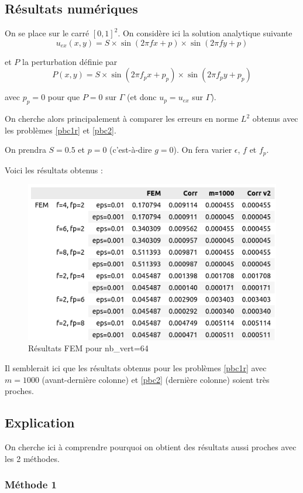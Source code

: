 \documentclass[french]{article}
\begin{document}
	\subsection{Résultats numériques}
	
	On se place sur le carré $[0,1]^2$. On considère ici la solution analytique suivante
	$$u_{ex}(x,y) = S\times\sin(2\pi fx + p)\times\sin(2\pi fy + p)$$ 
	
	et $P$ la perturbation définie par
	$$P(x,y)=S\times\sin(2\pi f_px + p_p)\times\sin(2\pi f_py + p_p)$$
	
	avec $p_p=0$ pour que $P=0$ sur $\Gamma$ (et donc $u_p=u_{ex}$ sur $\Gamma$). 
	
	On cherche alors principalement à comparer les erreurs en norme $L^2$ obtenus avec les problèmes \ref{pbc1r} et \ref{pbc2}.
	
	On prendra $S=0.5$ et $p=0$ (c'est-à-dire $g=0$). On fera varier $\epsilon$, $f$ et $f_p$. 
	
	Voici les résultats obtenus :
	
	\begin{minipage}{\linewidth}
		\begin{figure}[H]
			\centering
			\includegraphics[width=0.55\linewidth]{resultats.png}
			\caption{Résultats FEM pour nb\_vert=64}
		\end{figure}
	\end{minipage}

	Il semblerait ici que les résultats obtenus pour les problèmes \ref{pbc1r} avec $m=1000$ (avant-dernière colonne) et \ref{pbc2} (dernière colonne) soient très proches.

	\subsection{Explication}
	
	On cherche ici à comprendre pourquoi on obtient des résultats aussi proches avec les 2 méthodes.
	
	\subsubsection*{Méthode 1}
	
\end{document}
